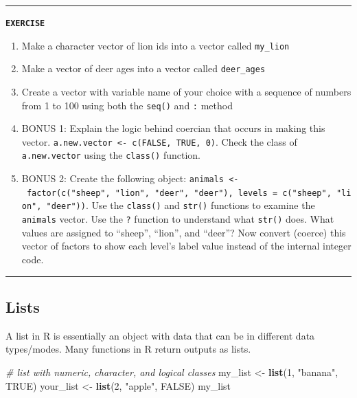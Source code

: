 \documentclass[
]{book}
\newenvironment{Shaded}{\begin{snugshade}}{\end{snugshade}}
\newcommand{\CommentTok}[1]{\textcolor[rgb]{0.56,0.35,0.01}{\textit{#1}}}
\newcommand{\ConstantTok}[1]{\textcolor[rgb]{0.56,0.35,0.01}{#1}}
\newcommand{\DecValTok}[1]{\textcolor[rgb]{0.00,0.00,0.81}{#1}}
\newcommand{\FunctionTok}[1]{\textcolor[rgb]{0.13,0.29,0.53}{\textbf{#1}}}
\newcommand{\NormalTok}[1]{#1}
\newcommand{\OtherTok}[1]{\textcolor[rgb]{0.56,0.35,0.01}{#1}}
\newcommand{\StringTok}[1]{\textcolor[rgb]{0.31,0.60,0.02}{#1}}
\providecommand{\tightlist}{%
  \setlength{\itemsep}{0pt}\setlength{\parskip}{0pt}}
\begin{document}
\begin{center}\rule{0.5\linewidth}{0.5pt}\end{center}

\textbf{\texttt{EXERCISE}}

\begin{enumerate}
\def\labelenumi{\arabic{enumi}.}
\tightlist
\item
  Make a character vector of lion ids into a vector called \texttt{my\_lion}
\item
  Make a vector of deer ages into a vector called \texttt{deer\_ages}
\item
  Create a vector with variable name of your choice with a sequence of numbers from 1 to 100 using both the \texttt{seq()} and \texttt{:} method
\item
  BONUS 1: Explain the logic behind coercian that occurs in making this vector. \texttt{a.new.vector\ \textless{}-\ c(FALSE,\ TRUE,\ 0)}. Check the class of \texttt{a.new.vector} using the \texttt{class()} function.
\item
  BONUS 2: Create the following object: \texttt{animals\ \textless{}-\ factor(c("sheep",\ "lion",\ "deer",\ "deer"),\ levels\ =\ c("sheep",\ "lion",\ "deer"))}. Use the \texttt{class()} and \texttt{str()} functions to examine the \texttt{animals} vector. Use the \texttt{?} function to understand what \texttt{str()} does. What values are assigned to ``sheep'', ``lion'', and ``deer''? Now convert (coerce) this vector of factors to show each level's label value instead of the internal integer code.
\end{enumerate}

\begin{center}\rule{0.5\linewidth}{0.5pt}\end{center}

\subsection{Lists}\label{lists}

A list in R is essentially an object with data that can be in different data types/modes. Many functions in R return outputs as lists.

\begin{Shaded}
\begin{Highlighting}[]
\CommentTok{\# list with numeric, character, and logical classes}
\NormalTok{my\_list }\OtherTok{\textless{}{-}} \FunctionTok{list}\NormalTok{(}\DecValTok{1}\NormalTok{, }\StringTok{"banana"}\NormalTok{, }\ConstantTok{TRUE}\NormalTok{)}
\NormalTok{your\_list }\OtherTok{\textless{}{-}} \FunctionTok{list}\NormalTok{(}\DecValTok{2}\NormalTok{, }\StringTok{"apple"}\NormalTok{, }\ConstantTok{FALSE}\NormalTok{)}
\NormalTok{my\_list}
\end{Highlighting}
\end{Shaded}
\end{document}
